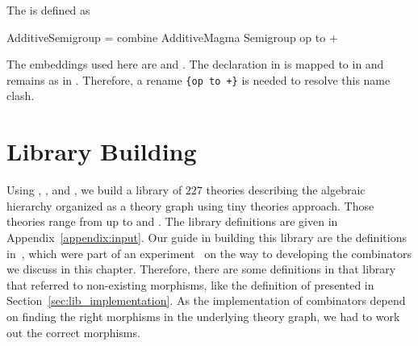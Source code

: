 The  is defined as 
\begin{togcode} 
AdditiveSemigroup = combine AdditiveMagma {} Semigroup {op to +} 
\end{togcode} 
The embeddings used here are  and . The declaration  in  is mapped to \lstmath{+} in  and remains as  in . Therefore, a rename \lstinline|{op to +}| is needed to resolve this name clash. 

\section{Library Building}
\label{sec:guidelines}
Using , , and , we build a library of $227$ theories describing the algebraic hierarchy organized as a theory graph using tiny theories approach. Those theories range from  up to  and  . The library definitions are given in Appendix~\ref{appendix:input}. 
Our guide in building this library are the definitions in~\cite{msLibDecls}, which were part of an experiment~\cite{mathscheme2011experiments} on the way to developing the combinators we discuss in this chapter. Therefore, there are some definitions in that library that referred to non-existing morphisms, like the definition of  presented in Section~\ref{sec:lib_implementation}. As the implementation of combinators depend on finding the right morphisms in the underlying theory graph, we had to work out the correct morphisms. 
 
